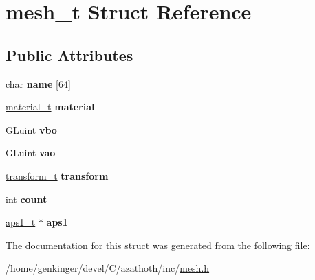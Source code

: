 \hypertarget{structmesh__t}{}\section{mesh\+\_\+t Struct Reference}
\label{structmesh__t}
\subsection*{Public Attributes}
\begin{DoxyCompactItemize}
\item 
\mbox{\label{structmesh__t_aab3f427102ddb6e5870d4d1a6c108279}} 
char {\bfseries name} \mbox{[}64\mbox{]}
\item 
\mbox{\label{structmesh__t_ada8c6fafdf4ca6e35ca0b0f3828c8fdf}} 
\mbox{\hyperlink{structmaterial__t}{material\+\_\+t}} {\bfseries material}
\item 
\mbox{\label{structmesh__t_a7c7ff0a17a0e63ebda16e0de0908de01}} 
G\+Luint {\bfseries vbo}
\item 
\mbox{\label{structmesh__t_ad23b3210eb7c56a9e472bec403ebc8f8}} 
G\+Luint {\bfseries vao}
\item 
\mbox{\label{structmesh__t_a7a9aada1bc807f236d374c702fbf8fd6}} 
\mbox{\hyperlink{structtransform__t}{transform\+\_\+t}} {\bfseries transform}
\item 
\mbox{\label{structmesh__t_a10ba674a6861320b103fade041f5d9e6}} 
int {\bfseries count}
\item 
\mbox{\label{structmesh__t_acec296ed16b0681aeee51b8241bd381d}} 
\mbox{\hyperlink{structaps1__t}{aps1\+\_\+t}} $\ast$ {\bfseries aps1}
\end{DoxyCompactItemize}


The documentation for this struct was generated from the following file\+:\begin{DoxyCompactItemize}
\item 
/home/genkinger/devel/\+C/azathoth/inc/\mbox{\hyperlink{mesh_8h}{mesh.\+h}}\end{DoxyCompactItemize}
